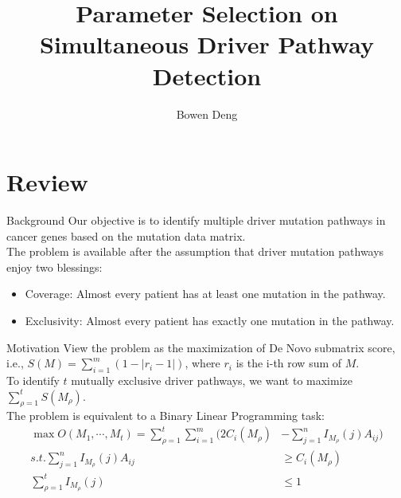 \documentclass[xcolor=dvipsnames]{beamer}
\begin{document}
\title{Parameter Selection on Simultaneous Driver Pathway Detection}
\author{Bowen Deng}
\date{}
\begin{frame}
\maketitle
\end{frame}
\begin{frame}
\tableofcontents
\end{frame}
\section{Review}
\begin{frame}{Background}
Our objective is to identify multiple driver mutation pathways in cancer genes based on the mutation data matrix.\\
The problem is available after the assumption that driver mutation pathways enjoy two blessings:\\
\begin{itemize}
\item Coverage: Almost every patient has at least one mutation in the pathway.\\
\item Exclusivity: Almost every patient has exactly one mutation in the pathway.\\
\end{itemize}
\end{frame}
\begin{frame}{Motivation}
View the problem as the maximization of De Novo submatrix score, i.e., $S(M)=\sum_{i=1}^m(1-|r_i-1|)$, where $r_i$ is the i-th row sum of $M$.\\
To identify $t$ mutually exclusive driver pathways, we want to maximize $\sum_{\rho=1}^tS(M_{\rho})$.\\
The problem is equivalent to a Binary Linear Programming task:\\
\begin{displaymath}
\begin{split}
\max O(M_1,\cdots,M_t)=\sum_{\rho=1}^t\sum_{i=1}^m(2C_i(M_{\rho})&-\sum_{j=1}^nI_{M_{\rho}}(j)A_{ij})\\
s.t. \sum_{j=1}^nI_{M_{\rho}}(j)A_{ij}&\geqslant C_i(M_{\rho})\\
\sum_{\rho=1}^tI_{M_{\rho}}(j)&\leqslant 1\\
\end{split}
\end{displaymath}
\end{frame}
\end{document}
